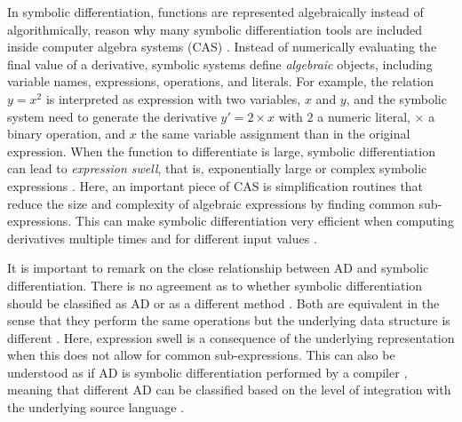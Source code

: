 In symbolic differentiation, functions are represented algebraically instead of algorithmically, reason why many symbolic differentiation tools are included inside computer algebra systems (CAS) \cite{Symbolics_jl_2022}. 
Instead of numerically evaluating the final value of a derivative, symbolic systems define \textit{algebraic} objects, including variable names, expressions, operations, and literals. 
For example, the relation $y = x^2$ is interpreted as expression with two variables, $x$ and $y$, and the symbolic system need to generate the derivative $y' = 2 \times x$ with $2$ a numeric literal, $\times$ a binary operation, and $x$ the same variable assignment than in the original expression.
When the function to differentiate is large, symbolic differentiation can lead to \textit{expression swell}, that is, exponentially large or complex symbolic expressions \cite{Baydin_Pearlmutter_Radul_Siskind_2015}.
Here, an important piece of CAS is simplification routines that reduce the size and complexity of algebraic expressions by finding common sub-expressions.  
This can make symbolic differentiation very efficient when computing derivatives multiple times and for different input values \cite{Dürrbaum_Klier_Hahn_2002}. 

It is important to remark on the close relationship between AD and symbolic differentiation.
There is no agreement as to whether symbolic differentiation should be classified as AD \cite{juedes1991taxonomy, Elliott_2018, Laue2020} or as a different method \cite{Baydin_Pearlmutter_Radul_Siskind_2015}.  
Both are equivalent in the sense that they perform the same operations but the underlying data structure is different \cite{Laue2020}. 
Here, expression swell is a consequence of the underlying representation when this does not allow for common sub-expressions. 
This can also be understood as if AD is symbolic differentiation performed by a compiler \cite{Elliott_2018}, meaning that different AD can be classified based on the level of integration with the underlying source language \cite{juedes1991taxonomy}.


